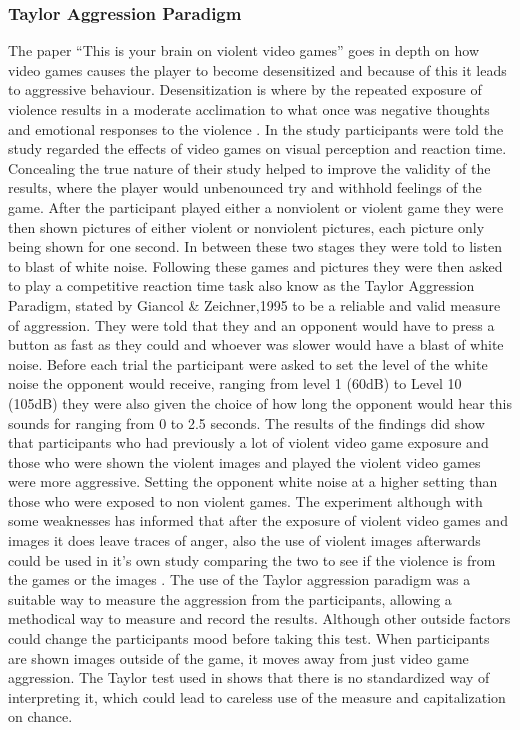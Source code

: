 \documentclass[journal]{IEEEtran}
\begin{document}
    \subsubsection{Taylor Aggression Paradigm}
        The paper “This is your brain on violent video games”\cite{Christopher} goes in depth on how video games causes the player to become desensitized and because of this it leads to aggressive behaviour. Desensitization is where by the repeated exposure of violence results in a moderate acclimation to what once was negative thoughts and emotional responses to the violence \cite{Tamara}. In the study participants were told the study regarded the effects of video games on visual perception and reaction time. Concealing the true nature of their study helped to improve the validity of the results, where the player would unbenounced try and withhold feelings of the game. After the participant played either a nonviolent or violent game they were then shown pictures of either violent or nonviolent pictures, each picture only being shown for one second. In between these two stages they were told to listen to blast of white noise. Following these games and pictures they were then asked to play a competitive reaction time task also know as the Taylor Aggression Paradigm, stated by Giancol \& Zeichner,1995 to be a reliable and valid measure of aggression. They were told that they and an opponent would have to press a button as fast as they could and whoever was slower would have a blast of white noise. Before each trial the participant were asked to set the level of the white noise the opponent would receive, ranging from level 1 (60dB) to Level 10 (105dB) they were also given the choice of how long the opponent would hear this sounds for ranging from 0 to 2.5 seconds. The results of the findings did show that participants who had previously a lot of violent video game exposure and those who were shown the violent images and played the violent video games were more aggressive. Setting the opponent white noise at a higher setting than those who were exposed to non violent games. The experiment although with some weaknesses has informed that after the exposure of violent video games and images it does leave traces of anger, also the use of violent images afterwards could be used in it’s own study comparing the two to see if the violence is from the games or the images . The use of the Taylor aggression paradigm was a suitable way to measure the aggression from the participants, allowing a methodical way to measure and record the results. Although other outside factors could change the participants mood before taking this test. When participants are shown images outside of the game, it moves away from just video game aggression. The Taylor test used in \cite{YoungWomen} \cite{ChristopherR} shows that there is no standardized way of interpreting it, which could lead to careless use of the measure and capitalization on chance.
\end{document}
